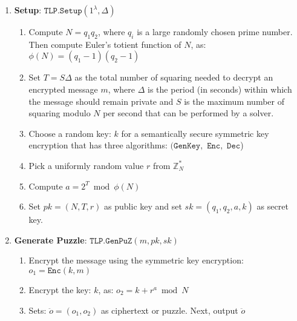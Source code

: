 \begin{enumerate}%

\item \textbf{Setup}: $\mathtt{TLP.Setup}(1^{\scriptscriptstyle\lambda}, \Delta)$
\begin{enumerate}


\item Compute $N=q_{\scriptscriptstyle 1}q_{\scriptscriptstyle 2}$, where $q_{\scriptscriptstyle i}$  is a large randomly chosen prime number. Then   compute Euler's totient function of $N$, as: $\phi(N)=(q_{\scriptscriptstyle 1}-1)(q_{\scriptscriptstyle 2}-1)$ 
\item  Set  $T=S\Delta$ as the total number of squaring needed to decrypt an encrypted message $m$, where $\Delta$ is the period (in seconds) within  which the message should remain private and $S$ is the maximum  number of squaring modulo $N$ per second that can be performed by a solver. 
\item  Choose a random key: $k$ for a semantically secure symmetric key encryption   that has  three algorithms: $(\mathtt{GenKey}, $ $\mathtt{Enc}, $ $\mathtt{Dec}$) 
\item Pick a uniformly random value $r$ from  $\mathbb{Z}^{\scriptscriptstyle *}_{\scriptscriptstyle N} $
\item Compute $a=2^{\scriptscriptstyle T}\bmod \phi(N)$
\item Set $pk=(N,T,r)$ as  public key and set $sk=(q_{\scriptscriptstyle 1},q_{\scriptscriptstyle 2},a,k)$ as secret key.
\end{enumerate}



\item\label{Generate-Puzzle-} \textbf{Generate Puzzle}: $\mathtt{TLP.GenPuZ}(m,pk,sk)$ %

\begin{enumerate}
\item\label{R-TLP::enc-message}  Encrypt the message using the symmetric key encryption: $o_{\scriptscriptstyle 1}= \mathtt{Enc}(k,m)$
\item Encrypt the key: $k$, as: $o_{\scriptscriptstyle 2}= k+r^{\scriptscriptstyle a}\bmod N$
\item Sets: $\ddot{o}=(o_{\scriptscriptstyle 1},o_{\scriptscriptstyle 2})$ as ciphertext or puzzle. Next, output $\ddot{o}$
\end{enumerate}





\end{enumerate}
